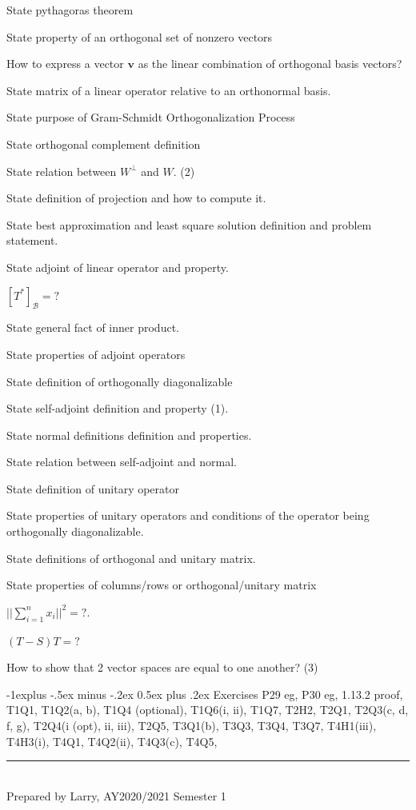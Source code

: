 \documentclass[10pt,landscape]{article}
\makeatletter
\renewcommand{\subsection}{\@startsection{subsection}{2}{0mm}%
                                {-1explus -.5ex minus -.2ex}%
                                {0.5ex plus .2ex}%
                                {\normalfont\normalsize\bfseries}}
\makeatother
\begin{document}
\begin{multicols}{4}
State pythagoras theorem

State property of an orthogonal set of nonzero vectors

How to express a vector $\mathbf{v}$ as the linear combination of orthogonal basis vectors?

State matrix of a linear operator relative to an orthonormal basis.

State purpose of Gram-Schmidt Orthogonalization Process

State orthogonal complement definition

State relation between $W^{\perp}$ and $W$. (2)

State definition of projection and how to compute it.

State best approximation and least square solution definition and problem statement.

State adjoint of linear operator and property.

$[T^*]_{\mathcal{B}} = ?$

State general fact of inner product.

State properties of adjoint operators

State definition of orthogonally diagonalizable

State self-adjoint definition and property (1).

State normal definitions definition and properties.

State relation between self-adjoint and normal.

State definition of unitary operator

State properties of unitary operators and conditions of the operator being orthogonally diagonalizable.

State definitions of orthogonal and unitary matrix.

State properties of columns/rows or orthogonal/unitary matrix

$|| \sum^n_{i = 1} x_i ||^2 = ?$.

$(T-S)T = ?$

How to show that 2 vector spaces are equal to one another? (3)



\subsection{Exercises}
P29 eg, P30 eg, 1.13.2 proof, T1Q1, T1Q2(a, b), T1Q4 (optional), T1Q6(i, ii), T1Q7, T2H2, T2Q1, T2Q3(c, d, f, g), T2Q4(i (opt), ii, iii), T2Q5, T3Q1(b), T3Q3, T3Q4, T3Q7, T4H1(iii), T4H3(i), T4Q1, T4Q2(ii), T4Q3(c), T4Q5,

\vfill
\hrule
~\\
Prepared by Larry, AY2020/2021 Semester 1
\end{multicols}
\end{document}
